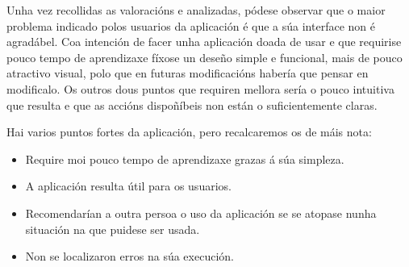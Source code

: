 Unha vez recollidas as valoracións e analizadas, pódese observar que o maior problema indicado polos usuarios da aplicación é que a súa interface non é agradábel. Coa intención de facer unha aplicación doada de usar e que requirise pouco tempo de aprendizaxe fíxose un deseño simple e funcional, mais de pouco atractivo visual, polo que en futuras modificacións habería que pensar en modificalo. Os outros dous puntos que requiren mellora sería o pouco intuitiva que resulta e que as accións dispoñíbeis non están o suficientemente claras.

Hai varios puntos fortes da aplicación, pero recalcaremos os de máis nota:
\begin{itemize}
	\item Require moi pouco tempo de aprendizaxe grazas á súa simpleza.
	\item A aplicación resulta útil para os usuarios.
	\item Recomendarían a outra persoa o uso da aplicación se se atopase nunha situación na que puidese ser usada.
	\item Non se localizaron erros na súa execución.
\end{itemize}